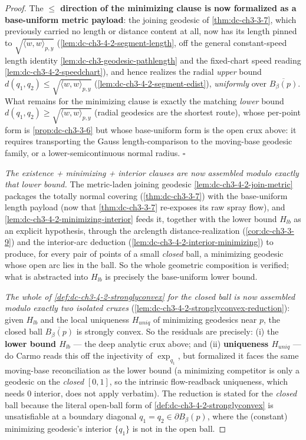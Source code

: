 \begin{proof}
  The \textbf{$\le$ direction of the minimizing clause is now formalized as a base-uniform metric
  payload}: the joining geodesic of \cref{thm:dc-ch3-3-7}, which previously carried no length or
  distance content at all, now has its length pinned to $\sqrt{\langle w,w\rangle_{p,y}}$
  (\cref{lem:dc-ch3-4-2-segment-length}, off the general constant-speed length identity
  \cref{lem:dc-ch3-geodesic-pathlength} and the fixed-chart speed reading
  \cref{lem:dc-ch3-4-2-speedchart}), and hence realizes the radial \emph{upper} bound
  $d(q_1,q_2)\le\sqrt{\langle w,w\rangle_{p,y}}$ (\cref{lem:dc-ch3-4-2-segment-edist}), \emph{uniformly}
  over $\overline{B_\beta(p)}$. What remains for the minimizing clause is exactly the matching
  \emph{lower} bound $d(q_1,q_2)\ge\sqrt{\langle w,w\rangle_{p,y}}$ (radial geodesics are the shortest
  route), whose per-point form is \cref{prop:dc-ch3-3-6} but whose base-uniform form is the open crux
  above: it requires transporting the Gauss length-comparison to the moving-base geodesic family, or
  a lower-semicontinuous normal radius. $\square$

  \emph{The existence + minimizing + interior clauses are now assembled modulo exactly that lower
  bound.} The metric-laden joining geodesic \cref{lem:dc-ch3-4-2-join-metric} packages the totally
  normal covering (\cref{thm:dc-ch3-3-7}) with the base-uniform length payload (now that
  \cref{thm:dc-ch3-3-7} re-exposes its raw spray flow), and \cref{lem:dc-ch3-4-2-minimizing-interior}
  feeds it, together with the lower bound $H_{lb}$ as an explicit hypothesis, through the
  arclength distance-realization (\cref{cor:dc-ch3-3-9}) and the interior-arc deduction
  (\cref{lem:dc-ch3-4-2-interior-minimizing}) to produce, for every pair of points of a small
  \emph{closed} ball, a minimizing geodesic whose open arc lies in the ball. So the whole geometric
  composition is verified; what is abstracted into $H_{lb}$ is precisely the base-uniform lower bound.

  \emph{The whole of \cref{def:dc-ch3-4-2-stronglyconvex} for the closed ball is now assembled modulo
  exactly two isolated cruxes} (\cref{lem:dc-ch3-4-2-stronglyconvex-reduction}): given $H_{lb}$ and the
  local uniqueness $H_{uniq}$ of minimizing geodesics near $p$, the closed ball $\overline{B_\beta(p)}$
  is strongly convex. So the residuals are precisely: (i) the \textbf{lower bound $H_{lb}$} --- the
  deep analytic crux above; and (ii) \textbf{uniqueness $H_{uniq}$} --- do Carmo reads this off the
  injectivity of $\exp_{q_1}$, but formalized it faces the same moving-base reconciliation as the
  lower bound (a minimizing competitor is only a geodesic on the \emph{closed} $[0,1]$, so the
  intrinsic flow-readback uniqueness, which needs $0$ interior, does not apply verbatim). The
  reduction is stated for the \emph{closed} ball because the literal open-ball form of
  \cref{def:dc-ch3-4-2-stronglyconvex} is unsatisfiable at a boundary diagonal $q_1=q_2\in\partial
  B_\beta(p)$, where the (constant) minimizing geodesic's interior $\{q_1\}$ is not in the open ball.
\end{proof}
